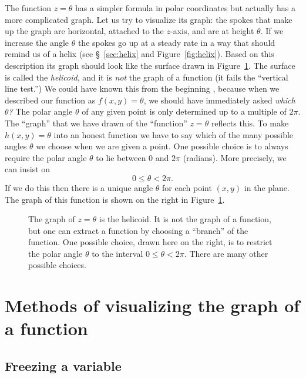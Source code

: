 The function $z=\theta$ has a simpler formula in polar coordinates but actually has a
more complicated graph. Let us try to visualize its graph:  the spokes that make up
the graph are horizontal, attached to the $z$-axis, and are at height $\theta$.  If
we increase the angle $\theta$ the spokes go up at a steady rate in a way that should
remind us of a helix (see \S~\ref{sec:helix} and Figure~\ref{fig:helix}).  Based on
this description its graph should look like the surface drawn in
Figure~\ref{fig:helicoid}.  The surface is called the \emph{helicoid}, and it is
\emph{not} the graph of a function (it fails the ``vertical line test.'')  We could
have known this from the beginning , because when we described our function as $f(x,
y) = \theta$, we should have immediately asked \textit{which $\theta$?}  The polar
angle $\theta$ of any given point is only determined up to a multiple of $2\pi$.  The
``graph'' that we have drawn of the ``function'' $z=\theta$ reflects this.  To make
$h(x, y) = \theta$ into an honest function we have to say which of the many
possible angles $\theta$ we choose when we are given a point.  One possible choice is
to always require the polar angle $\theta$ to lie between $0$ and $2\pi$ (radians).
More precisely, we can insist on 
\[
  0\leq \theta < 2\pi.
\]
If we do this then there is a unique angle $\theta$ for each point $(x,y)$ in the
plane.  The graph of this function is shown on the right in
Figure~\ref{fig:helicoid}.  

\begin{figure}[h]
  \parbox{0.4\textwidth}{  }
  \hfill
  \parbox{0.4\textwidth}{  }
  \caption{The graph of $z=\theta$ is the helicoid.  It is not the graph of a function,
  but one can extract a function by choosing a ``branch'' of the function.  One
  possible choice, drawn here on the right, is to restrict the polar angle $\theta$ to
  the interval $0\leq \theta < 2\pi$.  There are many other possible choices.  }  
  \label{fig:helicoid}
\end{figure}

\section{Methods of visualizing the graph of a function}  

\subsection{Freezing a variable}  

